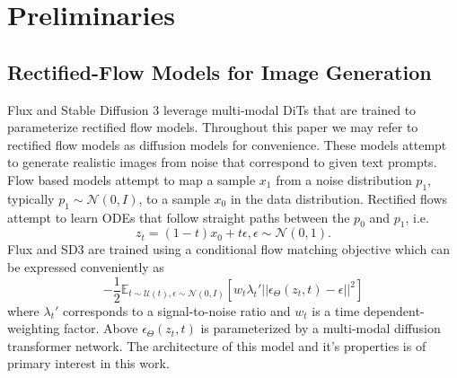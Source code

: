 

\section{Preliminaries}
\subsection{Rectified-Flow Models for Image Generation}

Flux and Stable Diffusion 3 leverage multi-modal DiTs that are trained to parameterize rectified flow models. Throughout this paper we may refer to rectified flow models as diffusion models for convenience. These models attempt to generate realistic images from noise that correspond to given text prompts. Flow based models \cite{lipman_flow_2023} attempt to map a sample $x_1$ from a noise distribution $p_1$, typically $p_1 \sim \mathcal{N}(0, I)$, to a sample $x_0$ in the data distribution. Rectified flows \cite{liu_flow_2022} attempt to learn ODEs that follow straight paths between the $p_0$ and $p_1$, i.e. 
\begin{equation}
    z_t = (1 - t) x_0 + t \epsilon, \epsilon \sim \mathcal{N}(0, 1).
\end{equation}
Flux and SD3 are trained using a conditional flow matching objective which can be expressed conveniently as
\begin{equation}
    -\frac{1}{2} \mathbb{E}_{t \sim \mathcal{U}(t), \epsilon \sim \mathcal{N}(0, I) }[w_t \lambda_t'||\epsilon_\Theta(z_t, t) - \epsilon||^2]
\end{equation}
where $\lambda_t'$ corresponds to a signal-to-noise ratio and $w_t$ is a time dependent-weighting factor. Above $\epsilon_\Theta(z_t, t)$ is parameterized by a multi-modal diffusion transformer network. The architecture of this model and it's properties is of primary interest in this work. 



